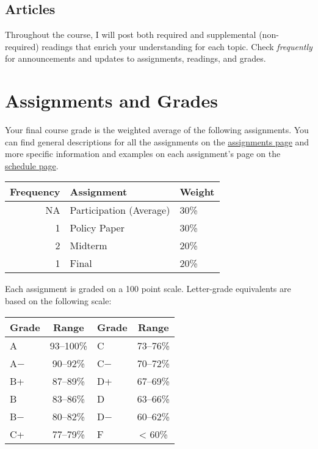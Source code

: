 \documentclass{article}
\begin{document}
\hypertarget{articles}{%
\subsection{Articles}\label{articles}}

Throughout the course, I will post both required and supplemental
(non-required) readings that enrich your understanding for each topic.
Check \emph{frequently} for announcements and updates to assignments,
readings, and grades.

\hypertarget{assignments-and-grades}{%
\section{Assignments and Grades}\label{assignments-and-grades}}

Your final course grade is the weighted average of the following
assignments. You can find general descriptions for all the assignments
on the
\href{http://devF21.classes.ryansafner.com/assignments/}{assignments
page} and more specific information and examples on each assignment's
page on the
\href{http://devF21.classes.ryansafner.com/schedule/}{schedule page}.

\begin{tabular}{r|l|l}
\hline
Frequency & Assignment & Weight\\
\hline
NA & Participation (Average) & 30\%\\
\hline
1 & Policy Paper & 30\%\\
\hline
2 & Midterm & 20\%\\
\hline
1 & Final & 20\%\\
\hline
\end{tabular}

Each assignment is graded on a 100 point scale. Letter-grade equivalents
are based on the following scale:

\begin{table}
\centering
\begin{tabular}{l|c|l|c}
\hline
Grade & Range & Grade & Range\\
\hline
A & 93–100\% & C & 73–76\%\\
\hline
A− & 90–92\% & C− & 70–72\%\\
\hline
B+ & 87–89\% & D+ & 67–69\%\\
\hline
B & 83–86\% & D & 63–66\%\\
\hline
B− & 80–82\% & D− & 60–62\%\\
\hline
C+ & 77–79\% & F & < 60\%\\
\hline
\end{tabular}
\end{table}
\end{document}
